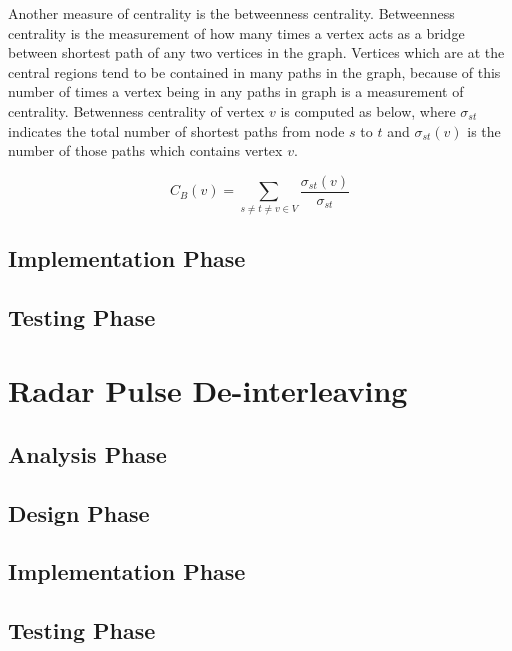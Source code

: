 \documentclass[12pt]{report}
\newcommand\ddfrac[2]{\frac{\displaystyle #1}{\displaystyle #2}}
\begin{document}
            Another measure of centrality is the betweenness centrality. Betweenness centrality is the measurement of how many times a vertex acts as a bridge between shortest 
            path of any two vertices in the graph. Vertices which are at the central regions tend to be contained in many paths in the graph, because of this number of times a
            vertex being in any paths in graph is a measurement of centrality. Betwenness centrality of vertex $v$ is computed as below, where $\sigma_{st}$ indicates the total
            number of shortest paths from node $s$ to $t$ and $\sigma_{st}(v)$ is the number of those paths which contains vertex $v$.

            \begin{equation}
                C_B(v) = \sum_{s \neq t \neq v \in V} \ddfrac{\sigma_{st}(v)}{\sigma_{st}}
            \end{equation}

            \bigskip

            
        \subsection{Implementation Phase}

        \subsection{Testing Phase}

    \section{Radar Pulse De-interleaving}
        \subsection{Analysis Phase}

        \subsection{Design Phase}

        \subsection{Implementation Phase}

        \subsection{Testing Phase}
\end{document}
